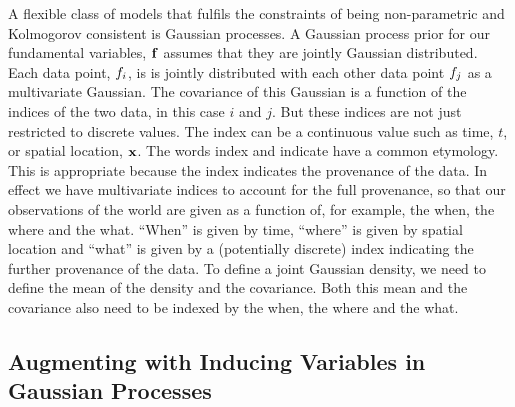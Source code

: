 \documentclass[a4paperpaper,]{article}
\begin{document}
A flexible class of models that fulfils the constraints of being
non-parametric and Kolmogorov consistent is Gaussian processes. A
Gaussian process prior for our fundamental variables,
\(\mathbf{ f}\) assumes that they are jointly Gaussian
distributed. Each data point, \(f_i\), is is jointly
distributed with each other data point \(f_j\) as a
multivariate Gaussian. The covariance of this Gaussian is a function of
the indices of the two data, in this case \(i\) and \(j\). But these
indices are not just restricted to discrete values. The index can be a
continuous value such as time, \(t\), or spatial location,
\(\mathbf{ x}\). The words index and indicate have a common etymology.
This is appropriate because the index indicates the provenance of the
data. In effect we have multivariate indices to account for the full
provenance, so that our observations of the world are given as a
function of, for example, the when, the where and the what. ``When'' is
given by time, ``where'' is given by spatial location and ``what'' is
given by a (potentially discrete) index indicating the further
provenance of the data. To define a joint Gaussian density, we need to
define the mean of the density and the covariance. Both this mean and
the covariance also need to be indexed by the when, the where and the
what.

\hypertarget{augmenting-with-inducing-variables-in-gaussian-processes}{%
\subsection{Augmenting with Inducing Variables in Gaussian
Processes}\label{augmenting-with-inducing-variables-in-gaussian-processes}}
\end{document}
